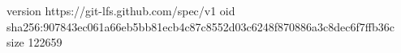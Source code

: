 version https://git-lfs.github.com/spec/v1
oid sha256:907843ec061a66eb5bb81ecb4c87c8552d03c6248f870886a3c8dec6f7ffb36c
size 122659
